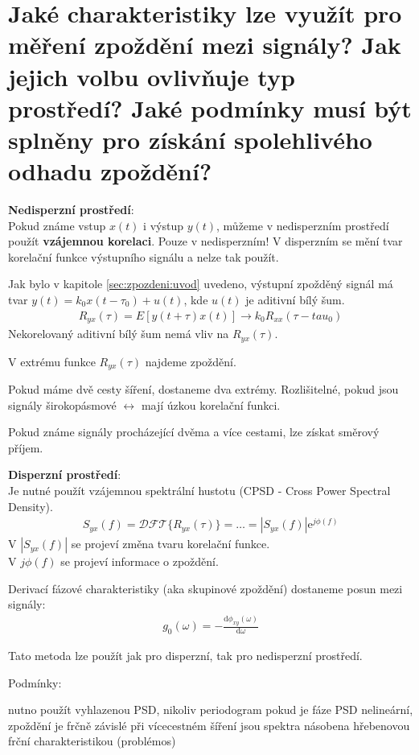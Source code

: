 \documentclass[a4paper,12pt]{article}   %
\newcommand{\mt}[1]{$#1$}
\newcommand{\e}{\text{e}}
\newcommand{\dd}{\text{d}}
\begin{document}
\section{Jaké charakteristiky lze využít pro měření zpoždění mezi signály? Jak jejich volbu ovlivňuje typ prostředí? Jaké podmínky musí být splněny pro získání spolehlivého odhadu zpoždění?}\label{sec:zpozdeni:zpusoby}

\textbf{Nedisperzní prostředí}:\\
Pokud známe vstup \mt{x(t)} i výstup \mt{y(t)}, můžeme v nedisperzním prostředí použít \textbf{vzájemnou korelaci}. Pouze v nedisperzním! V disperzním se mění tvar korelační funkce výstupního signálu a nelze tak použít. 

Jak bylo v kapitole \ref{sec:zpozdeni:uvod} uvedeno, výstupní zpožděný signál má tvar \mt{y(t) = k_0 x (t-\tau_0) + u(t)}, kde \mt{u(t)} je aditivní bílý šum.
\begin{align*}
        R_{yx}(\tau) = E[y(t+\tau)x(t)] \rightarrow k_0R_{xx}(\tau-tau_0)
\end{align*}
Nekorelovaný aditivní bílý šum nemá vliv na \mt{R_{yx}(\tau)}.

V extrému funkce \mt{R_{yx}(\tau)} najdeme zpoždění.

Pokud máme dvě cesty šíření, dostaneme dva extrémy. Rozlišitelné, pokud jsou signály širokopásmové \mt{\leftrightarrow} mají úzkou korelační funkci.

Pokud známe signály procházející dvěma a více cestami, lze získat směrový příjem.

\textbf{Disperzní prostředí}:\\
Je nutné použít vzájemnou spektrální hustotu (CPSD - Cross Power Spectral Density).
\begin{align*}
        S_{yx}(f) = \mathscr{DFT}\{R_{yx}(\tau)\} = \dots = |S_{yx}(f)|\e^{j\phi(f)}
\end{align*}
V \mt{|S_{yx}(f)|} se projeví změna tvaru korelační funkce.\\
V \mt{{j\phi(f)}} se projeví informace o zpoždění. 

Derivací fázové charakteristiky (aka skupinové zpoždění) dostaneme posun mezi signály:
\begin{align*}
        g_0(\omega) = -\frac{\dd \phi_{xy}(\omega)}{\dd \omega}
\end{align*}

Tato metoda lze použít jak pro disperzní, tak pro nedisperzní prostředí.

Podmínky:
\begin{outline}
        \1 nutno použít vyhlazenou PSD, nikoliv periodogram
        \1 pokud je fáze PSD nelineární, zpoždění je frčně závislé
        \1 při vícecestném šíření jsou spektra násobena hřebenovou frční charakteristikou (problémos)
\end{outline}
\end{document}
